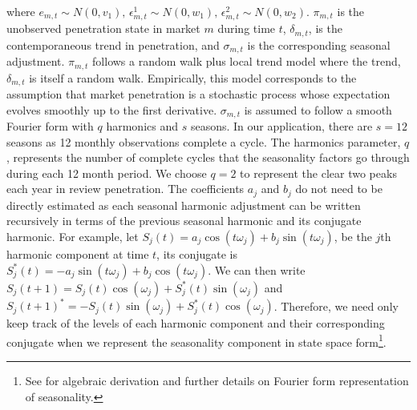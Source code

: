 \documentclass[12pt, leqno]{article}
\begin{document}
where $e_{m,t}\sim N(0,v_1)\text{, }\epsilon_{m,t}^{1}\sim N(0,w_1)\text{, }\epsilon_{m,t}^{2}\sim N(0,w_2)$. $\pi_{m,t}$ is the unobserved penetration state in market $m$ during time $t$, $\delta_{m,t}$, is the contemporaneous trend in penetration, and $\sigma_{m,t}$ is the corresponding seasonal adjustment. $\pi_{m,t}$ follows a random walk plus local trend model where the trend, $\delta_{m,t}$ is itself a random walk. Empirically, this model corresponds to the assumption that market penetration is a stochastic process whose expectation evolves smoothly up to the first derivative. $\sigma_{m,t}$ is assumed to follow a smooth Fourier form with $q$ harmonics and $s$ seasons. In our application, there are $s=12$ seasons as 12 monthly observations complete a cycle. The harmonics parameter, $q$, represents the number of complete cycles that the seasonality factors go through during each 12 month period. We choose $q=2$ to represent the clear two peaks each year in review penetration. The coefficients $a_j$ and $b_j$ do not need to be directly estimated as each seasonal harmonic adjustment can be written recursively in terms of the previous seasonal harmonic and its conjugate harmonic. For example, let $S_j(t)=a_j\cos(t\omega_j)+b_j\sin(t\omega_j)$, be the $j$th harmonic component at time $t$, its conjugate is $S_j^{*}(t)=-a_j\sin(t\omega_j)+b_j\cos(t\omega_j)$. We can then write $S_j(t+1)=S_j(t)\cos(\omega_j)+S_j^{*}(t)\sin(\omega_j)$ and $S_j(t+1)^{*}=-S_j(t)\sin(\omega_j)+S_j^{*}(t)\cos(\omega_j)$. Therefore, we need only keep track of the levels of each harmonic component and their corresponding conjugate when we represent the seasonality component in state space form\footnote{See \citet{petrisDLM} for algebraic derivation and further details on Fourier form representation of seasonality.}.
\end{document}
